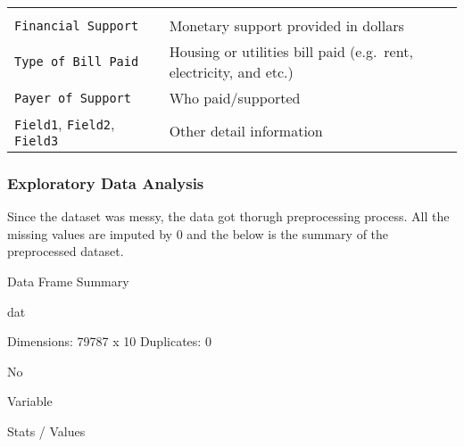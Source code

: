 \documentclass[]{article}
\begin{document}
\begin{longtable}[]{@{}ll@{}}
\begin{minipage}[t]{0.65\columnwidth}
\end{minipage}\tabularnewline
\begin{minipage}[t]{0.29\columnwidth}\raggedright
\texttt{Financial\ Support}\strut
\end{minipage} & \begin{minipage}[t]{0.65\columnwidth}\raggedright
Monetary support provided in dollars\strut
\end{minipage}\tabularnewline
\begin{minipage}[t]{0.29\columnwidth}\raggedright
\texttt{Type\ of\ Bill\ Paid}\strut
\end{minipage} & \begin{minipage}[t]{0.65\columnwidth}\raggedright
Housing or utilities bill paid (e.g.~rent, electricity, and etc.)\strut
\end{minipage}\tabularnewline
\begin{minipage}[t]{0.29\columnwidth}\raggedright
\texttt{Payer\ of\ Support}\strut
\end{minipage} & \begin{minipage}[t]{0.65\columnwidth}\raggedright
Who paid/supported\strut
\end{minipage}\tabularnewline
\begin{minipage}[t]{0.29\columnwidth}\raggedright
\texttt{Field1}, \texttt{Field2}, \texttt{Field3}\strut
\end{minipage} & \begin{minipage}[t]{0.65\columnwidth}\raggedright
Other detail information\strut
\end{minipage}\tabularnewline
\bottomrule
\end{longtable}

\hypertarget{exploratory-data-analysis}{%
\subsubsection{Exploratory Data
Analysis}\label{exploratory-data-analysis}}

Since the dataset was messy, the data got thorugh preprocessing process.
All the missing values are imputed by 0 and the below is the summary of
the preprocessed dataset.

Data Frame Summary

dat

Dimensions: 79787 x 10 Duplicates: 0

No

Variable

Stats / Values
\end{document}
